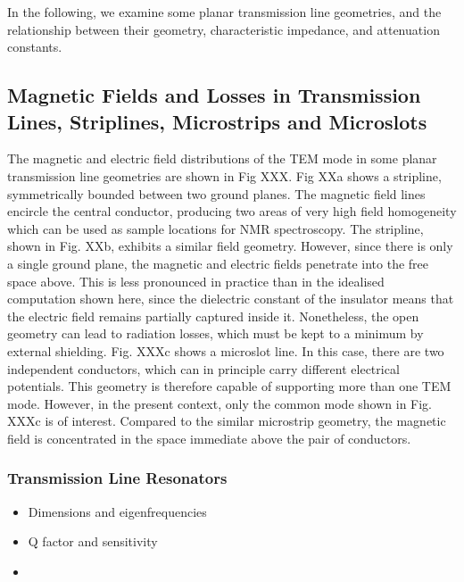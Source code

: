 In the following, we examine some planar transmission line geometries,
and the relationship between their geometry, characteristic impedance,
and attenuation constants.

\subsection{Magnetic Fields and Losses in Transmission Lines,
Striplines, Microstrips and
Microslots}

The magnetic and electric field distributions of the TEM mode in some
planar transmission line geometries are shown in Fig XXX. Fig XXa shows
a stripline, symmetrically bounded between two ground planes. The
magnetic field lines encircle the central conductor, producing two areas
of very high field homogeneity which can be used as sample locations for
NMR spectroscopy. The stripline, shown in Fig. XXb, exhibits a similar
field geometry. However, since there is only a single ground plane, the
magnetic and electric fields penetrate into the free space above. This
is less pronounced in practice than in the idealised computation shown
here, since the dielectric constant of the insulator means that the
electric field remains partially captured inside it. Nonetheless, the
open geometry can lead to radiation losses, which must be kept to a
minimum by external shielding. Fig. XXXc shows a microslot line. In this
case, there are two independent conductors, which can in principle carry
different electrical potentials. This geometry is therefore capable of
supporting more than one TEM mode. However, in the present context, only
the common mode shown in Fig. XXXc is of interest. Compared to the
similar microstrip geometry, the magnetic field is concentrated in the
space immediate above the pair of conductors.

\subsubsection{Transmission Line
Resonators}\label{transmission-line-resonators}

\begin{itemize}
\item
  Dimensions and eigenfrequencies
\item
  Q factor and sensitivity
\item
\end{itemize}
